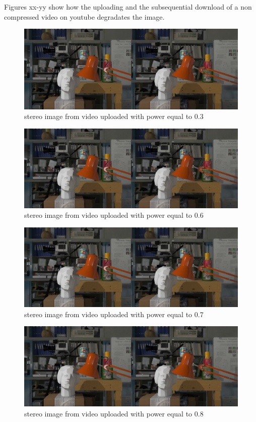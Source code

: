 Figures xx-yy show how the uploading and the subsequential download of a non compressed video on youtube degradates the image.\newline
 
\begin{figure}[h!]
\centering
\includegraphics[width=1\textwidth]{./img/yt_03_gt.png}
\caption{\small{stereo image from video uploaded with power equal to 0.3 }}
\label{fig:03yt}
\end{figure}
\begin{figure}[h!]
\centering
\includegraphics[width=1\textwidth]{./img/yt_06_gt.png}
\caption{\small{stereo image from video uploaded with power equal to 0.6 }}
\label{fig:06yt}
\end{figure}
\begin{figure}[h!]
\centering
\includegraphics[width=1\textwidth]{./img/yt_07_gt.png}
\caption{\small{stereo image from video uploaded with power equal to 0.7 }}
\label{fig:07yt}
\end{figure}
\begin{figure}[h!]
\centering
\includegraphics[width=1\textwidth]{./img/yt_08_gt.png}
\caption{\small{stereo image from video uploaded with power equal to 0.8 }}
\label{fig:08yt}
\end{figure}

